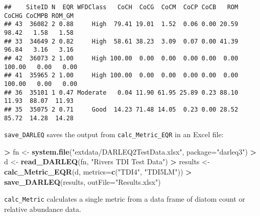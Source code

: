 \documentclass[]{article}
\newenvironment{Shaded}{\begin{snugshade}}{\end{snugshade}}
\newcommand{\DataTypeTok}[1]{\textcolor[rgb]{0.13,0.29,0.53}{#1}}
\newcommand{\KeywordTok}[1]{\textcolor[rgb]{0.13,0.29,0.53}{\textbf{#1}}}
\newcommand{\NormalTok}[1]{#1}
\newcommand{\OperatorTok}[1]{\textcolor[rgb]{0.81,0.36,0.00}{\textbf{#1}}}
\newcommand{\StringTok}[1]{\textcolor[rgb]{0.31,0.60,0.02}{#1}}
\begin{document}
\begin{Shaded}
\end{Shaded}

\begin{verbatim}
##    SiteID N  EQR WFDClass   CoCH  CoCG  CoCM  CoCP CoCB   ROM  CoCHG CoCMPB ROM_GM
## 43  36082 2 0.88     High  79.41 19.01  1.52  0.06 0.00 20.59  98.42   1.58   1.58
## 33  34649 2 0.82     High  58.61 38.23  3.09  0.07 0.00 41.39  96.84   3.16   3.16
## 42  36073 2 1.00     High 100.00  0.00  0.00  0.00 0.00  0.00 100.00   0.00   0.00
## 41  35965 2 1.00     High 100.00  0.00  0.00  0.00 0.00  0.00 100.00   0.00   0.00
## 36  35101 1 0.47 Moderate   0.04 11.90 61.95 25.89 0.23 88.10  11.93  88.07  11.93
## 35  35075 2 0.71     Good  14.23 71.48 14.05  0.23 0.00 28.52  85.72  14.28  14.28
\end{verbatim}

\texttt{save\_DARLEQ} saves the output from \texttt{calc\_Metric\_EQR}
in an Excel file:

\begin{Shaded}
\begin{Highlighting}[]
\OperatorTok{>}\StringTok{ }\NormalTok{fn <-}\StringTok{ }\KeywordTok{system.file}\NormalTok{(}\StringTok{"extdata/DARLEQ2TestData.xlsx"}\NormalTok{, }\DataTypeTok{package=}\StringTok{"darleq3"}\NormalTok{)}
\OperatorTok{>}\StringTok{ }\NormalTok{d <-}\StringTok{ }\KeywordTok{read_DARLEQ}\NormalTok{(fn, }\StringTok{"Rivers TDI Test Data"}\NormalTok{)}
\OperatorTok{>}\StringTok{ }\NormalTok{results <-}\StringTok{ }\KeywordTok{calc_Metric_EQR}\NormalTok{(d, }\DataTypeTok{metrics=}\KeywordTok{c}\NormalTok{(}\StringTok{"TDI4"}\NormalTok{, }\StringTok{"TDI5LM"}\NormalTok{))}
\OperatorTok{>}\StringTok{ }\KeywordTok{save_DARLEQ}\NormalTok{(results, }\DataTypeTok{outFile=}\StringTok{"Results.xlsx"}\NormalTok{)}
\end{Highlighting}
\end{Shaded}

\texttt{calc\_Metric} calculates a single metric from a data frame of
diatom count or relative abundance data.

\begin{Shaded}
\end{Shaded}
\end{document}
